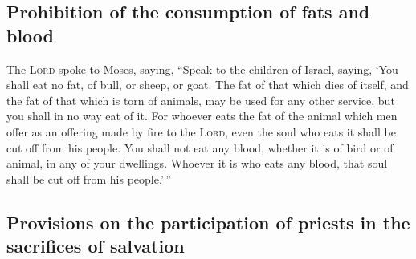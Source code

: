 \hypertarget{prohibition-of-the-consumption-of-fats-and-blood}{%
\subsection{Prohibition of the consumption of fats and
blood}\label{prohibition-of-the-consumption-of-fats-and-blood}}

 The \textsc{Lord} spoke to Moses, saying,
 ``Speak to the children of Israel, saying, `You shall
eat no fat, of bull, or sheep, or goat.  The fat of that
which dies of itself, and the fat of that which is torn of animals, may
be used for any other service, but you shall in no way eat of it.
 For whoever eats the fat of the animal which men offer
as an offering made by fire to the \textsc{Lord}, even the soul who eats
it shall be cut off from his people.  You shall not eat
any blood, whether it is of bird or of animal, in any of your dwellings.
 Whoever it is who eats any blood, that soul shall be cut
off from his people.'\,''

\hypertarget{provisions-on-the-participation-of-priests-in-the-sacrifices-of-salvation}{%
\subsection{Provisions on the participation of priests in the sacrifices
of
salvation}\label{provisions-on-the-participation-of-priests-in-the-sacrifices-of-salvation}}

